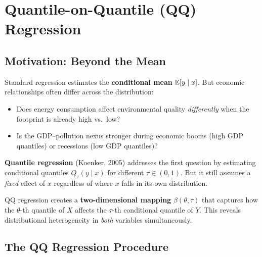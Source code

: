 
\section{Quantile-on-Quantile (QQ) Regression}

\subsection{Motivation: Beyond the Mean}

Standard regression estimates the \textbf{conditional mean} $\mathbb{E}[y \mid x]$. But economic relationships often differ across the distribution:

\begin{itemize}[leftmargin=2em]
\item Does energy consumption affect environmental quality \emph{differently} when the footprint is already high vs.\ low?
\item Is the GDP--pollution nexus stronger during economic booms (high GDP quantiles) or recessions (low GDP quantiles)?
\end{itemize}

\textbf{Quantile regression} (Koenker, 2005) addresses the first question by estimating conditional quantiles $Q_\tau(y \mid x)$ for different $\tau \in (0,1)$. But it still assumes a \emph{fixed} effect of $x$ regardless of where $x$ falls in its own distribution.

\begin{definitionbox}
QQ regression creates a \textbf{two-dimensional mapping} $\beta(\theta, \tau)$ that captures how the $\theta$-th quantile of $X$ affects the $\tau$-th conditional quantile of $Y$. This reveals distributional heterogeneity in \emph{both} variables simultaneously.
\end{definitionbox}

\subsection{The QQ Regression Procedure}

